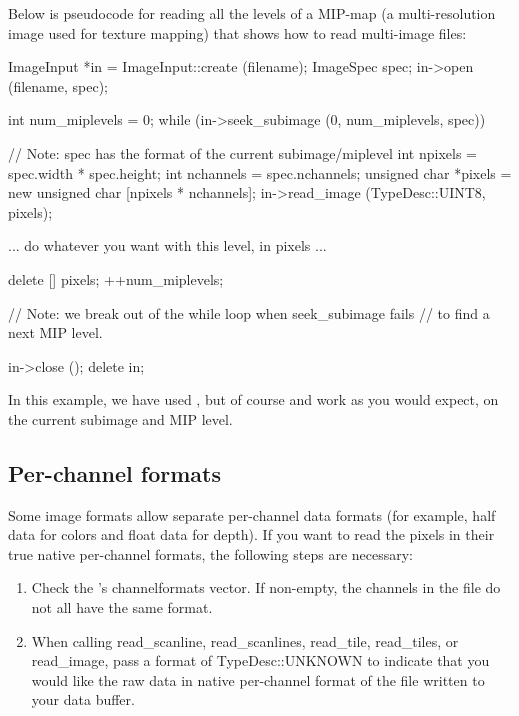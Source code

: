 Below is pseudocode for reading all the levels of a MIP-map (a
multi-resolution image used for texture mapping) that shows how to read
multi-image files:

\begin{code}
        ImageInput *in = ImageInput::create (filename);
        ImageSpec spec;
        in->open (filename, spec);

        int num_miplevels = 0;
        while (in->seek_subimage (0, num_miplevels, spec)) {
            // Note: spec has the format of the current subimage/miplevel
            int npixels = spec.width * spec.height;
            int nchannels = spec.nchannels;
            unsigned char *pixels = new unsigned char [npixels * nchannels];
            in->read_image (TypeDesc::UINT8, pixels);

            ... do whatever you want with this level, in pixels ...

            delete [] pixels;
            ++num_miplevels;
        }
        // Note: we break out of the while loop when seek_subimage fails
        // to find a next MIP level.

        in->close ();
        delete in;
\end{code}

In this example, we have used \readimage, but of course \readscanline
and \readtile work as you would expect, on the current subimage and MIP
level.


\subsection{Per-channel formats}
\label{sec:imageinput:channelformats}

Some image formats allow separate per-channel data formats (for example,
{\cf half} data for colors and {\cf float} data for depth).  If you want
to read the pixels in their true native per-channel formats,
the following steps are necessary:

\begin{enumerate}
\item Check the \ImageSpec's {\cf channelformats} vector.  If non-empty,
  the channels in the file do not all have the same format.
\item When calling {\cf read_scanline}, {\cf read_scanlines},
  {\cf read_tile}, {\cf read_tiles}, or {\cf read_image}, 
  pass a format of {\cf TypeDesc::UNKNOWN} to indicate that
  you would like the raw data in native per-channel format of the file
  written to your {\cf data} buffer.
\end{enumerate}

